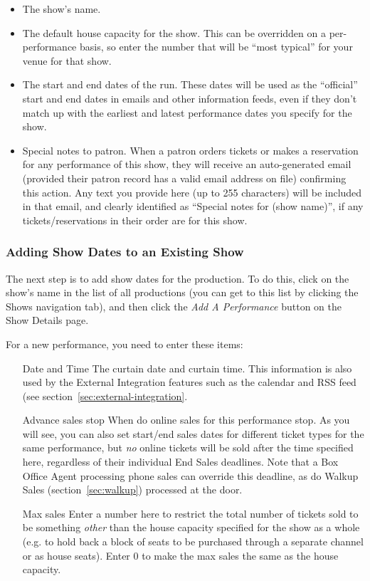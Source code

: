 \begin{itemize}
\item The show's name.
\item The default house capacity for the show. This can be overridden on
  a per-performance basis, so enter the number that will be ``most
  typical'' for your venue for that show.
\item The start and end dates of the run.  These dates will be used as
  the ``official'' start and end dates in emails and other information
  feeds, even if they don't match up with the earliest and latest
  performance 
  dates you specify for the show.
\item Special notes to patron. When a patron orders tickets or makes
  a reservation for any performance of this show, they will receive an
  auto-generated email (provided their patron record has a valid email
  address on file) confirming this action. Any text you provide here (up
  to 255 characters) will be included in that email, and clearly
  identified as ``Special notes for (show name)'', if any
  tickets/reservations in their order are for this show.
\end{itemize}


\subsubsection{Adding Show Dates to an Existing Show}
\label{sec:addingshowdates}

The next step is to add show dates for the production.  To do this,
click on the show's name in the list of all productions (you can get to
this list by clicking the Shows navigation tab), and then click
the \emph{Add A Performance} button on the Show Details page.

For a new performance, you need to enter these items:
\begin{enumerate}
\item[Date and Time] The curtain date and curtain time.  This
  information is also used by the External Integration features such as
  the calendar and RSS feed (see section~\ref{sec:external-integration}.
\item[Advance sales stop] When do online sales for this performance
  stop.  As you will see, you can also set start/end sales dates for
  different ticket types for the same performance, but \emph{no} online
  tickets will be sold after the time specified here, regardless of
  their individual End Sales deadlines.  Note that a Box Office Agent
  processing phone sales can override this deadline, as do Walkup
  Sales (section~\ref{sec:walkup}) processed at the door.
\item[Max sales] Enter a number here to restrict the total number of
  tickets sold to be something \emph{other} than the house capacity
  specified for the show as a whole (e.g. to hold back a block of seats
  to be purchased through a separate channel or as house seats).  Enter
  0 to make the max sales the same as the house capacity.
\end{enumerate}

